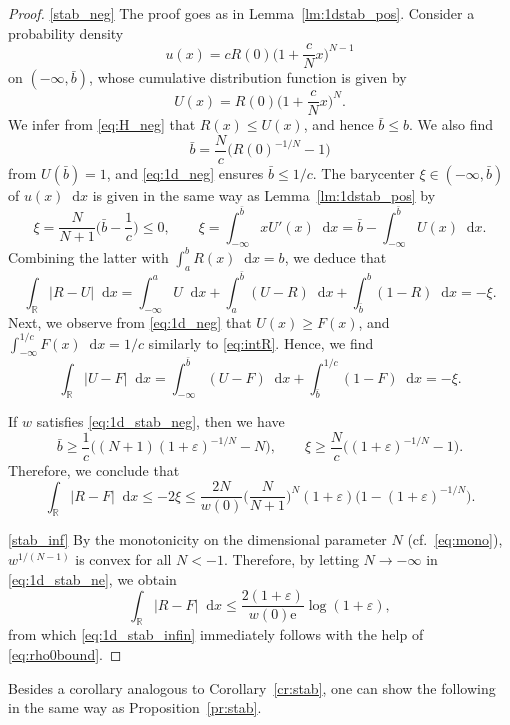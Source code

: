 \documentclass[sts]{imsart}
\theoremstyle{definition}
\theoremstyle{remark}
\newcommand{\R}{\mathbb{R}}
\newcommand{\ve}{\varepsilon}
\newcommand{\e}{\mathrm{e}}
\newcommand*\diff{\mathop{}\!\mathrm{d}}
\newcommand{\js}[1]{\textcolor{purple}{\textbf{JS:}  #1}}
\begin{document}
\begin{proof}
\eqref{stab_neg}
The proof goes as in Lemma~\ref{lm:1dstab_pos}.
Consider a probability density
\[ u(x)=cR(0)\biggl(1+\frac{c}{N}x\biggr)^{N-1} \]
on $(-\infty,\bar{b})$, whose cumulative distribution function is given by
\[ U(x) = R(0)\biggl(1+\frac{c}{N}x\biggr)^{N}. \]
We infer from \eqref{eq:H_neg} that $R(x) \le U(x)$, and hence $\bar{b} \le b$.
We also find
\[
\bar{b}=\frac{N}{c} \bigl( R(0)^{-1/N}-1 \bigr)
\]
from $U(\bar{b})=1$,
and \eqref{eq:1d_neg} ensures $\bar{b}\leq 1/c$.
The barycenter $\xi \in (-\infty,\bar{b})$ of $u(x) \diff x$ is given in the same way as Lemma~\ref{lm:1dstab_pos} by
\[
\xi = \frac{N}{N+1}\biggl(\bar{b}-\frac{1}{c} \biggr)\le 0, \qquad
\xi =\int_{-\infty}^{\bar{b}} xU'(x) \diff x
=\bar{b} -\int_{-\infty}^{\bar{b}} U(x) \diff x.
\]
Combining the latter with $\int_a^b R(x) \diff x=b$, we deduce that
\[
    \int_\R |R-U|\diff x
    = \int_{-\infty}^a U \diff x + \int_a^{\bar{b}} (U-R) \diff x + \int_{\bar{b}}^b (1-R) \diff x
    = -\xi.
\]
Next, we observe from \eqref{eq:1d_neg} that $U(x) \ge F(x)$, and $\int_{-\infty}^{1/c} F(x) \diff x =1/c$ similarly to \eqref{eq:intR}.
Hence, we find
\[
   \int_\R |U-F| \diff x
   = \int_{-\infty}^{\bar{b}} (U-F) \diff x + \int_{\bar{b}}^{1/c} (1-F) \diff x
   = -\xi.
\]

If $w$ satisfies \eqref{eq:1d_stab_neg}, then we have
\[
\bar{b} \geq \frac{1}{c} \bigl( (N+1)(1+\ve)^{-1/N} -N \bigr), \qquad
\xi \geq \frac{N}{c} \bigl( (1+\ve)^{-1/N} -1 \bigr).
\]
Therefore, we conclude that
\[
\int_\R |R-F| \diff x
\le -2\xi 
\le \frac{2N}{w(0)} \biggl( \frac{N}{N+1} \biggr)^N (1+\ve) \bigl( 1-(1+\ve)^{-1/N} \bigr). \]

\eqref{stab_inf}
By the monotonicity on the dimensional parameter $N$ (cf.\ \eqref{eq:mono}), $w^{1/(N-1)}$ is convex for all $N<-1$.
Therefore, by letting $N \to -\infty$ in \eqref{eq:1d_stab_ne}, we obtain
\[
\int_\R |R-F| \diff x
\le \frac{2(1+\ve)}{w(0)\e} \log (1+\ve),
\]
from which \eqref{eq:1d_stab_infin} immediately follows with the help of \eqref{eq:rho0bound}.
\end{proof}

Besides a corollary analogous to Corollary~\ref{cr:stab}, one can show the following in the same way as Proposition~\ref{pr:stab}.
\end{document}
